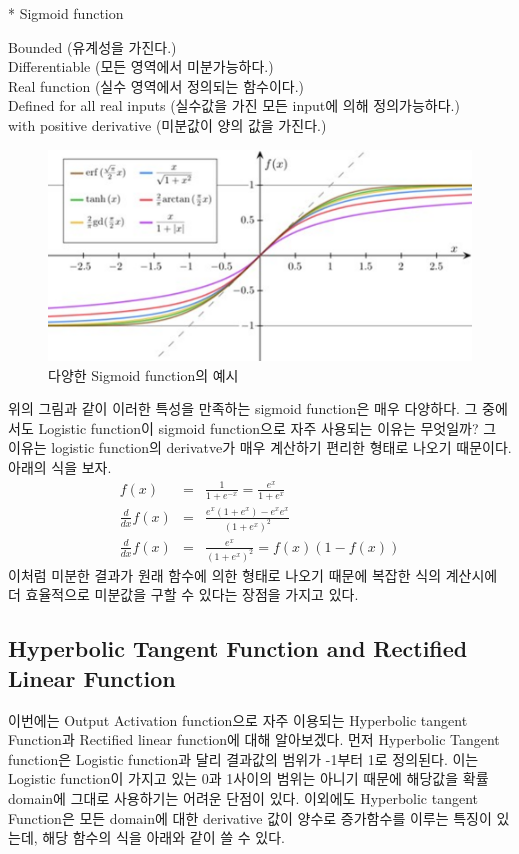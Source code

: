 \documentclass[draft=false]{oblivoir}
\begin{document}
* Sigmoid function
\begin{center}
    Bounded (유계성을 가진다.)\\
    Differentiable (모든 영역에서 미분가능하다.)\\
    Real function (실수 영역에서 정의되는 함수이다.)\\
    Defined for all real inputs (실수값을 가진 모든 input에 의해 정의가능하다.)\\
    with positive derivative (미분값이 양의 값을 가진다.)
\end{center}
\begin{figure}[ht] \centering 
\includegraphics[scale=0.6]{fig14_6.png} 
\caption{다양한 Sigmoid function의 예시}
\label{fig:14-6}
\end{figure}
위의 그림과 같이 이러한 특성을 만족하는 sigmoid function은 매우 다양하다.  그 중에서도 Logistic function이 sigmoid function으로 자주 사용되는 이유는 무엇일까? 그 이유는 logistic function의 derivatve가 매우 계산하기 편리한 형태로 나오기 때문이다. 아래의 식을 보자.
\begin{eqnarray}
f(x) & = &  \frac{1}{1+e^{-x}} = \frac{e^{x}}{1+e^{x}}\\ 
\frac{d}{dx}f(x) & = & \frac{e^{x}(1+e^{x})-e^{x}e^{x}}{(1+e^{x})^{2}}\\
\frac{d}{dx}f(x) & = & \frac{e^{x}}{(1+e^{x})^{2}} = f(x)(1-f(x))
\end{eqnarray}
이처럼 미분한 결과가 원래 함수에 의한 형태로 나오기 때문에 복잡한 식의 계산시에 더 효율적으로 미분값을 구할 수 있다는 장점을 가지고 있다.
\subsection{Hyperbolic Tangent Function and Rectified Linear Function}
이번에는 Output Activation function으로 자주 이용되는 Hyperbolic tangent Function과 Rectified linear function에 대해 알아보겠다. 먼저 Hyperbolic Tangent function은 Logistic function과 달리 결과값의 범위가 -1부터 1로 정의된다. 이는 Logistic function이 가지고 있는 0과 1사이의 범위는 아니기 때문에 해당값을 확률 domain에 그대로 사용하기는 어려운 단점이 있다. 이외에도 Hyperbolic tangent Function은 모든 domain에 대한 derivative 값이 양수로 증가함수를 이루는 특징이 있는데, 해당 함수의 식을 아래와 같이 쓸 수 있다. \\
\end{document}
